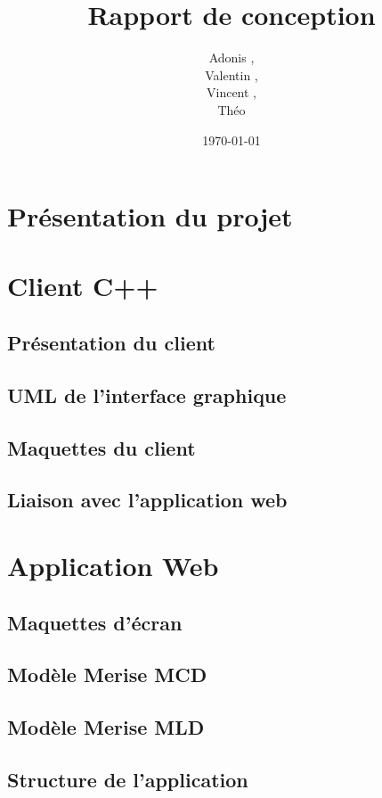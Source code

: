 \documentclass[a4paper]{article}
\title{Rapport de conception}
\author{Adonis \bsc{Najimi},\\
 Valentin \bsc{Stern},\\
 Vincent \bsc{Albert},\\
 Théo \bsc{Gerriet}}
\date{\today}
\begin{document}
\maketitle
\newpage

\section{Présentation du projet}
\section{Client C++}
	\subsection{Présentation du client}
	\subsection{UML de l'interface graphique}
		
	\subsection{Maquettes du client}
		
	\subsection{Liaison avec l'application web}
		
\section{Application Web}
	\subsection{Maquettes d'écran}
		
	\subsection{Modèle Merise MCD}
		
	\subsection{Modèle Merise MLD}
		
	\subsection{Structure de l'application}
		

\newpage
\tableofcontents
\end{document}
